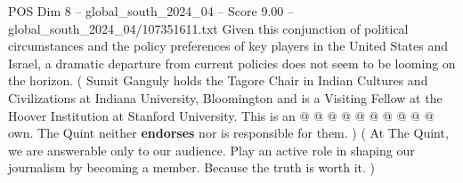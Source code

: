 \begin{textsample}{POS Dim 8 – global\_south\_2024\_04 – Score 9.00 – global\_south\_2024\_04/107351611.txt}
Given this conjunction of political circumstances and the policy preferences of key players in the United States and Israel, a dramatic departure from current policies does not seem to be looming on the horizon. ( Sumit Ganguly holds the Tagore Chair in Indian Cultures and Civilizations at Indiana University, Bloomington and is a Visiting Fellow at the Hoover Institution at Stanford University.
This is an @ @ @ @ @ @ @ @ @ @ own.
The Quint neither \textbf{endorses} nor is responsible for them. ) ( At The Quint, we are answerable only to our audience.
Play an active role in shaping our journalism by becoming a member.
Because the truth is worth it. )

\end{textsample}
